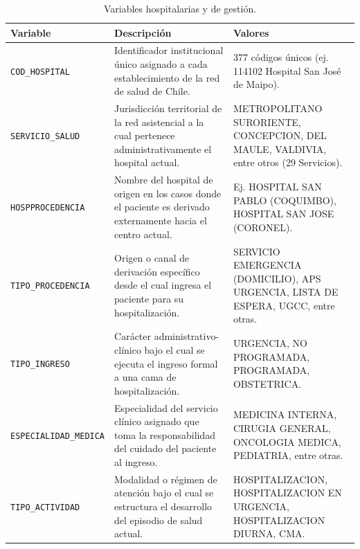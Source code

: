 \begin{table}[htbp]
\centering
\footnotesize
\setlength{\tabcolsep}{4pt}
\renewcommand{\arraystretch}{1.15}
\caption{Variables hospitalarias y de gestión.}
\label{tab:variables_hospitalarias}
\begin{tabular}{|l|l|l|}
\hline
\parbox[t]{3.8cm}{\textbf{Variable}} & \parbox[t]{5.4cm}{\textbf{Descripción}} & \parbox[t]{3.8cm}{\textbf{Valores}} \\ \hline
\parbox[t]{3.8cm}{\texttt{COD\_HOSPITAL}} & \parbox[t]{5.4cm}{Identificador institucional único asignado a cada establecimiento de la red de salud de Chile.} & \parbox[t]{3.8cm}{377 códigos únicos (ej. 114102 Hospital San José de Maipo).} \\ \hline
\parbox[t]{3.8cm}{\texttt{SERVICIO\_SALUD}} & \parbox[t]{5.4cm}{Jurisdicción territorial de la red asistencial a la cual pertenece administrativamente el hospital actual.} & \parbox[t]{3.8cm}{METROPOLITANO SURORIENTE, CONCEPCION, DEL MAULE, VALDIVIA, entre otros (29 Servicios).} \\ \hline
\parbox[t]{3.8cm}{\texttt{HOSPPROCEDENCIA}} & \parbox[t]{5.4cm}{Nombre del hospital de origen en los casos donde el paciente es derivado externamente hacia el centro actual.} & \parbox[t]{3.8cm}{Ej. HOSPITAL SAN PABLO (COQUIMBO), HOSPITAL SAN JOSE (CORONEL).} \\ \hline
\parbox[t]{3.8cm}{\texttt{TIPO\_PROCEDENCIA}} & \parbox[t]{5.4cm}{Origen o canal de derivación específico desde el cual ingresa el paciente para su hospitalización.} & \parbox[t]{3.8cm}{SERVICIO EMERGENCIA (DOMICILIO), APS URGENCIA, LISTA DE ESPERA, UGCC, entre otras.} \\ \hline
\parbox[t]{3.8cm}{\texttt{TIPO\_INGRESO}} & \parbox[t]{5.4cm}{Carácter administrativo-clínico bajo el cual se ejecuta el ingreso formal a una cama de hospitalización.} & \parbox[t]{3.8cm}{URGENCIA, NO PROGRAMADA, PROGRAMADA, OBSTETRICA.} \\ \hline
\parbox[t]{3.8cm}{\texttt{ESPECIALIDAD\_MEDICA}} & \parbox[t]{5.4cm}{Especialidad del servicio clínico asignado que toma la responsabilidad del cuidado del paciente al ingreso.} & \parbox[t]{3.8cm}{MEDICINA INTERNA, CIRUGIA GENERAL, ONCOLOGIA MEDICA, PEDIATRIA, entre otras.} \\ \hline
\parbox[t]{3.8cm}{\texttt{TIPO\_ACTIVIDAD}} & \parbox[t]{5.4cm}{Modalidad o régimen de atención bajo el cual se estructura el desarrollo del episodio de salud actual.} & \parbox[t]{3.8cm}{HOSPITALIZACION, HOSPITALIZACION EN URGENCIA, HOSPITALIZACION DIURNA, CMA.} \\ \hline

\end{tabular}
\end{table}
